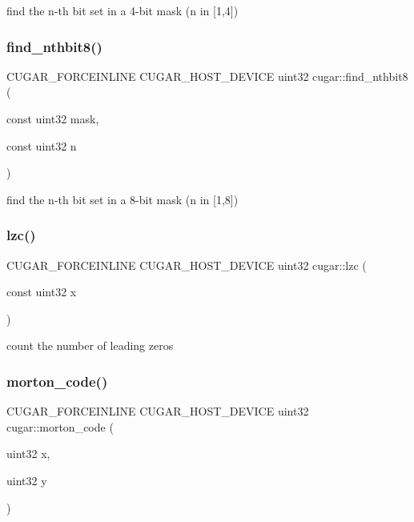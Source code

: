 find the n-\/th bit set in a 4-\/bit mask (n in \mbox{[}1,4\mbox{]}) \mbox{\label{group___bits_module_ga38b135612da4fe8202152a56dc9b9508}} 
\subsubsection{\texorpdfstring{find\+\_\+nthbit8()}{find\_nthbit8()}}
{\footnotesize\ttfamily C\+U\+G\+A\+R\+\_\+\+F\+O\+R\+C\+E\+I\+N\+L\+I\+NE C\+U\+G\+A\+R\+\_\+\+H\+O\+S\+T\+\_\+\+D\+E\+V\+I\+CE uint32 cugar\+::find\+\_\+nthbit8 (\begin{DoxyParamCaption}\item[{const uint32}]{mask,  }\item[{const uint32}]{n }\end{DoxyParamCaption})}

find the n-\/th bit set in a 8-\/bit mask (n in \mbox{[}1,8\mbox{]}) \mbox{\label{group___bits_module_gad2be8d91a93a10a6a9601f4f89bf752b}} 
\subsubsection{\texorpdfstring{lzc()}{lzc()}}
{\footnotesize\ttfamily C\+U\+G\+A\+R\+\_\+\+F\+O\+R\+C\+E\+I\+N\+L\+I\+NE C\+U\+G\+A\+R\+\_\+\+H\+O\+S\+T\+\_\+\+D\+E\+V\+I\+CE uint32 cugar\+::lzc (\begin{DoxyParamCaption}\item[{const uint32}]{x }\end{DoxyParamCaption})}

count the number of leading zeros \mbox{\label{group___bits_module_ga6494ab687521f35e3e28dc1524d15218}} 
\subsubsection{\texorpdfstring{morton\+\_\+code()}{morton\_code()}\hspace{0.1cm}{\footnotesize\ttfamily [1/2]}}
{\footnotesize\ttfamily C\+U\+G\+A\+R\+\_\+\+F\+O\+R\+C\+E\+I\+N\+L\+I\+NE C\+U\+G\+A\+R\+\_\+\+H\+O\+S\+T\+\_\+\+D\+E\+V\+I\+CE uint32 cugar\+::morton\+\_\+code (\begin{DoxyParamCaption}\item[{uint32}]{x,  }\item[{uint32}]{y }\end{DoxyParamCaption})}

